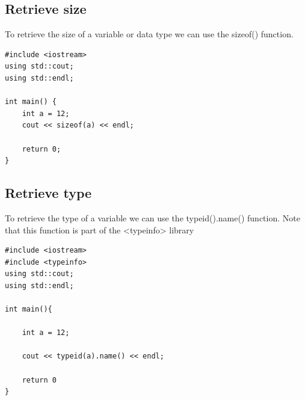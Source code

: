 \documentclass{report}
\begin{document}
    \pagebreak \bigbreak \noindent 
    \subsection{Retrieve size}
    \bigbreak \noindent 
    To retrieve the size of a variable or data type we can use the sizeof() function.
    \bigbreak \noindent 
    \sepline
    \begin{verbatim}
#include <iostream>
using std::cout;
using std::endl;

int main() {
    int a = 12;
    cout << sizeof(a) << endl;

    return 0;
}
    \end{verbatim}
    \sepline

    \bigbreak \noindent \bigbreak \noindent 
    \subsection{Retrieve type}
    \bigbreak \noindent 
    To retrieve the type of a variable we can use the typeid().name() function. Note that this function is part of the <typeinfo> library
    \bigbreak \noindent 
    \sepline
    \begin{verbatim}
#include <iostream>
#include <typeinfo>
using std::cout;
using std::endl;

int main(){

    int a = 12;

    cout << typeid(a).name() << endl;

    return 0
}
    \end{verbatim}
    \sepline
    \pagebreak \bigbreak \noindent 
\end{document}
